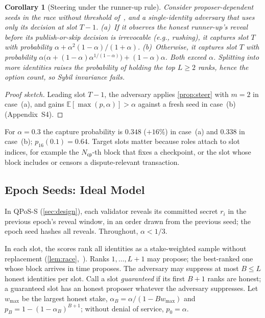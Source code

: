 \documentclass[10pt,journal,compsoc]{IEEEtran}
\theoremstyle{tplain}
\newtheorem{corollary}[theorem]{Corollary}
\theoremstyle{tdef}
\theoremstyle{remark}
\newcommand{\supp}[1]{Appendix~#1}
\begin{document}
\begin{corollary}[Steering under the runner-up rule]\label{cor:qrl}
Consider proposer-dependent seeds in the race without threshold of~\cite{QRL}, and a single-identity adversary that uses only its decision at slot $T-1$. (a)~If it observes the honest runner-up's reveal before its publish-or-skip decision is irrevocable (e.g., rushing), it captures slot $T$ with probability $\alpha+\alpha^2(1-\alpha)/(1+\alpha)$. (b)~Otherwise, it captures slot $T$ with probability $\alpha\big(\alpha+(1-\alpha)\alpha^{1/(1-\alpha)}\big)+(1-\alpha)\alpha$. Both exceed $\alpha$. Splitting into more identities raises the probability of holding the top $L\ge 2$ ranks, hence the option count, so Sybil invariance fails.
\end{corollary}
\begin{proof}[Proof sketch]
Leading slot $T-1$, the adversary applies \cref{prop:steer} with $m=2$ in case~(a), and gains $\mathbb E[\max(p,\alpha)]>\alpha$ against a fresh seed in case~(b) (\supp{S4}).
\end{proof}
\noindent For $\alpha=0.3$ the capture probability is $0.348$ ($+16\%$) in case~(a) and $0.338$ in case~(b); $p_{16}(0.1)=0.64$. Target slots matter because roles attach to slot indices, for example the $N_{\mathsf{cp}}$-th block that fixes a checkpoint, or the slot whose block includes or censors a dispute-relevant transaction.

\subsection{Epoch Seeds: Ideal Model}

In QPoS-S (\cref{sec:design}), each validator reveals its committed secret $r_i$ in the previous epoch's reveal window, in an order drawn from the previous seed; the epoch seed hashes all reveals. Throughout, $\alpha<1/3$.

In each slot, the scores rank all identities as a stake-weighted sample without replacement (\cref{lem:race},~\cite{efraimidis2006}). Ranks $1,\dots,L+1$ may propose; the best-ranked one whose block arrives in time proposes. The adversary may suppress at most $B\le L$ honest identities per slot. Call a slot \emph{guaranteed} if its first $B+1$ ranks are honest; a guaranteed slot has an honest proposer whatever the adversary suppresses. Let $w_{\max}$ be the largest honest stake, $\alpha_B=\alpha/(1-Bw_{\max})$ and $p_B=1-(1-\alpha_B)^{B+1}$; without denial of service, $p_0=\alpha$.
\end{document}

